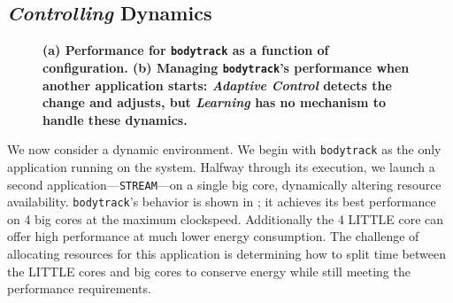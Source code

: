 
\subsection{\emph{Controlling} Dynamics}



\begin{figure}
\centering
  \subfloat[]
  {
    
    \label{fig:BODYTRACK_timeline}    
  }
  \caption{\small \bf (a) Performance for \texttt{bodytrack} as a
    function of configuration. (b) Managing \texttt{bodytrack}'s
    performance when another application starts: \emph{Adaptive
      Control} detects the change and adjusts, but \emph{Learning} has
    no mechanism to handle these dynamics. }
  \label{fig:control}
\end{figure}


We now consider a dynamic environment.  We begin with
\texttt{bodytrack} as the only application running on the system.
Halfway through its execution, we launch a second
application---\texttt{STREAM}---on a single big core, dynamically
altering resource availability. \texttt{bodytrack}'s behavior is
shown in ; it achieves its best performance on 4
big cores at the maximum clockspeed. Additionally the 4 LITTLE core 
can offer high performance at much lower energy consumption.  
The challenge of allocating resources for this application is determining how to split time between the LITTLE cores and big cores to conserve energy while still meeting the
performance requirements.  

